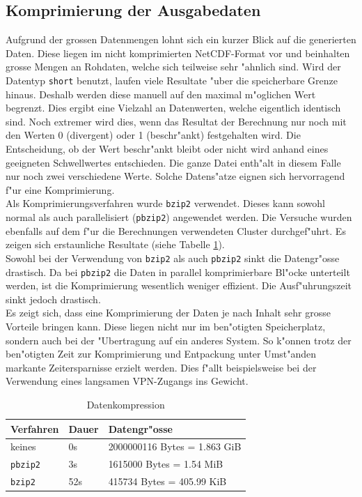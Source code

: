 \begin{refsection}
	\subsection{Komprimierung der Ausgabedaten}
		Aufgrund der grossen Datenmengen lohnt sich ein kurzer Blick auf die generierten Daten. Diese liegen im nicht komprimierten NetCDF-Format vor und beinhalten grosse Mengen an Rohdaten, welche sich teilweise sehr "ahnlich sind. Wird der Datentyp {\tt short} benutzt, laufen viele Resultate "uber die speicherbare Grenze hinaus. Deshalb werden diese manuell auf den maximal m"oglichen Wert begrenzt. Dies ergibt eine Vielzahl an Datenwerten, welche eigentlich identisch sind. Noch extremer wird dies, wenn das Resultat der Berechnung nur noch mit den Werten 0 (divergent) oder 1 (beschr"ankt) festgehalten wird. Die Entscheidung, ob der Wert beschr"ankt bleibt oder nicht wird anhand eines geeigneten Schwellwertes entschieden. Die ganze Datei enth"alt in diesem Falle nur noch zwei verschiedene Werte. Solche Datens"atze eignen sich hervorragend f"ur eine Komprimierung. \\[0.3cm]
		Als Komprimierungsverfahren wurde {\tt bzip2} verwendet. Dieses kann sowohl normal als auch parallelisiert ({\tt pbzip2}) angewendet werden. Die Versuche wurden ebenfalls auf dem f"ur die Berechnungen verwendeten Cluster durchgef"uhrt. Es zeigen sich erstaunliche Resultate (siehe Tabelle \ref{kompression}).\\[0.3cm] 
		Sowohl bei der Verwendung von {\tt bzip2} als auch {\tt pbzip2} sinkt die Datengr"osse drastisch. Da bei {\tt pbzip2} die Daten in parallel komprimierbare Bl"ocke unterteilt werden, ist die Komprimierung wesentlich weniger effizient. Die Ausf"uhrungszeit sinkt jedoch drastisch. \\[0.3cm]
		Es zeigt sich, dass eine Komprimierung der Daten je nach Inhalt sehr grosse Vorteile bringen kann. Diese liegen nicht nur im ben"otigten Speicherplatz, sondern auch bei der "Ubertragung auf ein anderes System. So k"onnen trotz der ben"otigten Zeit zur Komprimierung und Entpackung unter Umst"anden markante Zeitersparnisse erzielt werden. Dies f"allt beispielsweise bei der Verwendung eines langsamen VPN-Zugangs ins Gewicht.
		\begin{table}[ht]\centering
			\begin{tabular}{|l|l|l|}
				\hline
				Verfahren & Dauer & Datengr"osse \\ \hline
				keines & 0s & 2000000116 Bytes = 1.863 GiB \\ \hline
				{\tt pbzip2} & 3s & 1615000 Bytes = 1.54 MiB \\ \hline
				{\tt bzip2} & 52s & 415734 Bytes = 405.99 KiB \\ \hline
			\end{tabular}
			\caption{Datenkompression}
			\label{kompression}
		\end{table}

		
\printbibliography[heading=subbibliography]
\end{refsection}
